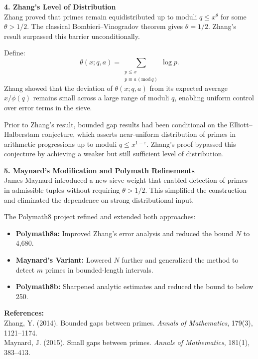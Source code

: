 \begin{technical}
\vspace{0.7em}
\textbf{4. Zhang’s Level of Distribution}\\[0.5em]
Zhang proved that primes remain equidistributed up to moduli \( q \le x^\theta \) for some \( \theta > 1/2 \). The classical Bombieri–Vinogradov theorem gives \( \theta = 1/2 \). Zhang’s result surpassed this barrier unconditionally.

Define:
\[
\theta(x; q, a) = \sum_{\substack{p \le x \\ p \equiv a \,(\mathrm{mod}\,q)}} \log p.
\]
Zhang showed that the deviation of \( \theta(x; q, a) \) from its expected average \( x / \phi(q) \) remains small across a large range of moduli \( q \), enabling uniform control over error terms in the sieve.

Prior to Zhang’s result, bounded gap results had been conditional on the Elliott–Halberstam conjecture, which asserts near-uniform distribution of primes in arithmetic progressions up to moduli \( q \le x^{1 - \varepsilon} \). Zhang's proof bypassed this conjecture by achieving a weaker but still sufficient level of distribution.

\vspace{0.7em}
\textbf{5. Maynard’s Modification and Polymath Refinements}\\[0.5em]
James Maynard introduced a new sieve weight that enabled detection of primes in admissible tuples without requiring \( \theta > 1/2 \). This simplified the construction and eliminated the dependence on strong distributional input.

The Polymath8 project refined and extended both approaches:
\begin{itemize}[leftmargin=*]
    \item \textbf{Polymath8a:} Improved Zhang’s error analysis and reduced the bound \( N \) to 4,680.
    \item \textbf{Maynard’s Variant:} Lowered \( N \) further and generalized the method to detect \( m \) primes in bounded-length intervals.
    \item \textbf{Polymath8b:} Sharpened analytic estimates and reduced the bound to below 250.
\end{itemize}

\vspace{0.5em}
\textbf{References:}\\[0.3em]
Zhang, Y. (2014). Bounded gaps between primes. \textit{Annals of Mathematics}, 179(3), 1121–1174.\\
Maynard, J. (2015). Small gaps between primes. \textit{Annals of Mathematics}, 181(1), 383–413.

\end{technical}
